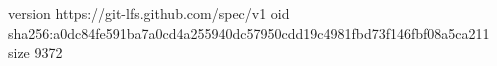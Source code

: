 version https://git-lfs.github.com/spec/v1
oid sha256:a0dc84fe591ba7a0cd4a255940dc57950cdd19c4981fbd73f146fbf08a5ca211
size 9372
